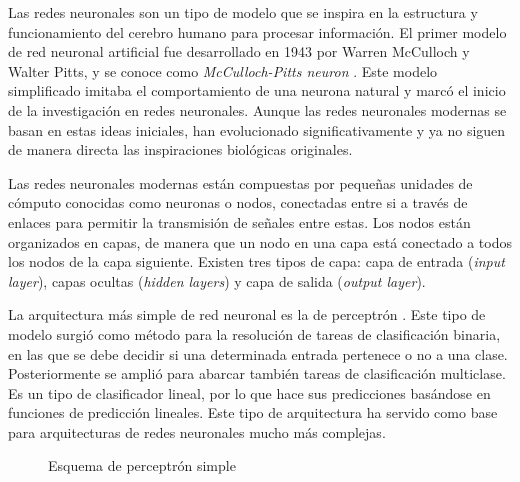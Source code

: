 \documentclass[11pt,spanish,listoffigures,listoftables]{tfgetsinf}
\begin{document}
Las redes neuronales son un tipo de modelo que se inspira en la estructura y funcionamiento del cerebro humano para procesar información. El primer modelo de red neuronal artificial fue desarrollado en 1943 por Warren McCulloch y Walter Pitts, y se conoce como \textit{McCulloch-Pitts neuron} \cite{mcculloch1943logical}. Este modelo simplificado imitaba el comportamiento de una neurona natural y marcó el inicio de la investigación en redes neuronales. Aunque las redes neuronales modernas se basan en estas ideas iniciales, han evolucionado significativamente y ya no siguen de manera directa las inspiraciones biológicas originales.

Las redes neuronales modernas están compuestas por pequeñas unidades de cómputo conocidas como neuronas o nodos, conectadas entre si a través de enlaces para permitir la transmisión de señales entre estas. Los nodos están organizados en capas, de manera que un nodo en una capa está conectado a todos los nodos de la capa siguiente. Existen tres tipos de capa: capa de entrada (\textit{input layer}), capas ocultas (\textit{hidden layers}) y capa de salida (\textit{output layer}). 

La arquitectura más simple de red neuronal es la de perceptrón \cite{RevModPhys.34.123}. Este tipo de modelo surgió como método para la resolución de tareas de clasificación binaria, en las que se debe decidir si una determinada entrada pertenece o no a una clase. Posteriormente se amplió para abarcar también tareas de clasificación multiclase. Es un tipo de clasificador lineal, por lo que hace sus predicciones basándose en funciones de predicción lineales. Este tipo de arquitectura ha servido como base para arquitecturas de redes neuronales mucho más complejas.

\begin{figure}[h]
	\centering
	\caption{Esquema de perceptrón simple}
	\label{fig:perceptronSimple}	
\end{figure}
\end{document}
